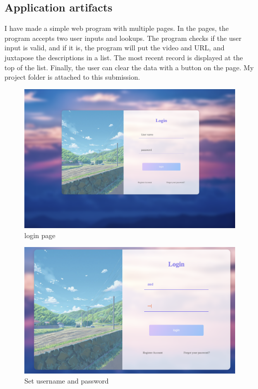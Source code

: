 \documentclass[a4paper, 11pt]{report}
\begin{document}
\subsection{Application artifacts}
I have made a simple web program with multiple pages. In the pages, the program accepts two user inputs and lookups. The program checks if the user input is valid, and if it is, the program will put the video and URL, and juxtapose the descriptions in a list. The most recent record is displayed at the top of the list. Finally, the user can clear the data with a button on the page. My project folder is attached to this submission.

\newpage

\begin{figure}
\includegraphics[width=1\linewidth]{login.png}
\caption{\label{login.png}login page}
\end{figure}

\begin{figure}
\includegraphics[width=1\linewidth]{login1.png}
\caption{\label{login1.png}Set username and password}
\end{figure}
\end{document}
